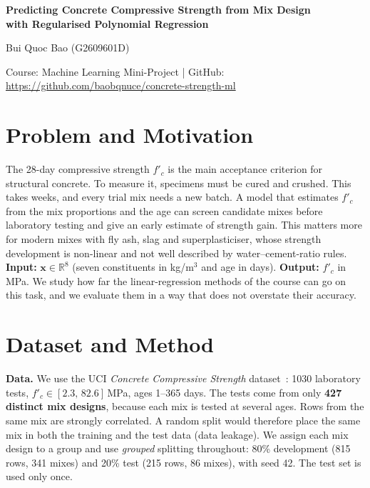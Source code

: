 \documentclass[10pt,a4paper]{article}
\begin{document}
\begin{center}
{\Large\bfseries Predicting Concrete Compressive Strength from Mix Design\\ with Regularised Polynomial Regression\par}
\vspace{5pt}
{\normalsize Bui Quoc Bao (G2609601D)\par}
\vspace{2pt}
{\small Course: Machine Learning Mini-Project \quad | \quad GitHub: \url{https://github.com/baobqnuce/concrete-strength-ml}\par}
\end{center}
\vspace{-6pt}

\section{Problem and Motivation}
The 28-day compressive strength $f'_c$ is the main acceptance criterion for structural concrete.
To measure it, specimens must be cured and crushed. This takes weeks, and every trial mix
needs a new batch. A model that estimates $f'_c$ from the mix proportions and the age can
screen candidate mixes before laboratory testing and give an early estimate of strength
gain. This matters more for modern mixes with fly ash, slag and superplasticiser,
whose strength development is non-linear and not well described by water--cement-ratio rules.
\textbf{Input:} $\mathbf x\in\mathbb R^8$ (seven constituents in kg/m$^3$ and age in days).
\textbf{Output:} $f'_c$ in MPa.
We study how far the linear-regression methods of the course can go on this task, and
we evaluate them in a way that does not overstate their accuracy.

\section{Dataset and Method}
\textbf{Data.} We use the UCI \emph{Concrete Compressive Strength} dataset~\cite{yeh,uci}:
1030 laboratory tests, $f'_c\in[2.3,\,82.6]$\,MPa, ages 1--365 days. The tests come from only
\textbf{427 distinct mix designs}, because each mix is tested at several ages. Rows from the same
mix are strongly correlated. A random split would therefore place the same mix in both the
training and the test data (data leakage). We assign each mix design to a group and use
\emph{grouped} splitting throughout: 80\% development (815 rows, 341 mixes) and 20\% test
(215 rows, 86 mixes), with seed 42. The test set is used only once.
\end{document}

